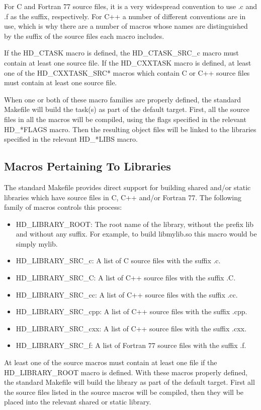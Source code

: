 \documentclass[11pt]{book}
\begin{document}
For C and Fortran 77 source files, it is a very widespread
convention to use .c and .f as the suffix, respectively.
For C++ a number of different conventions
are in use, which is why there are a number of macros whose
names are distinguished by the suffix of the source files
each macro includes.

If the HD\_CTASK macro is defined, the HD\_CTASK\_SRC\_c
macro must contain at least one source file. If the HD\_CXXTASK
macro is defined, at least one of the HD\_CXXTASK\_SRC* macros
which contain C or C++ source files must contain at least
one source file.

When one or both of these macro families are properly defined,
the standard Makefile will build the task(s) as part of the default
target. First, all the source files in all the macros will be
compiled, using the flags specified in the relevant HD\_*FLAGS
macro. Then the resulting object files will be linked to the
libraries specified in the relevant HD\_*LIBS macro.

\subsection{Macros Pertaining To Libraries}
The standard Makefile provides direct support for building
shared and/or static libraries which have source files in C,
C++ and/or Fortran 77. The following family of macros controls
this process:

\begin{itemize}
\item HD\_LIBRARY\_ROOT: The root name of the library, without
the prefix lib and without any suffix. For example, to build
libmylib.so this macro would be simply mylib.
\item HD\_LIBRARY\_SRC\_c: A list of C source files with the
suffix .c.
\item HD\_LIBRARY\_SRC\_C: A list of C++ source files with the
suffix .C.
\item HD\_LIBRARY\_SRC\_cc: A list of C++ source files with the
suffix .cc.
\item HD\_LIBRARY\_SRC\_cpp: A list of C++ source files with the
suffix .cpp.
\item HD\_LIBRARY\_SRC\_cxx: A list of C++ source files with the
suffix .cxx.
\item HD\_LIBRARY\_SRC\_f: A list of Fortran 77 source files
with the suffix .f.
\end{itemize}

At least one of the source macros must contain at least one
file if the HD\_LIBRARY\_ROOT macro is defined. With these
macros properly defined, the standard Makefile will build
the library as part of the default target. First all the
source files listed in the source macros will be compiled,
then they will be placed into the relevant shared or static
library.
\end{document}
